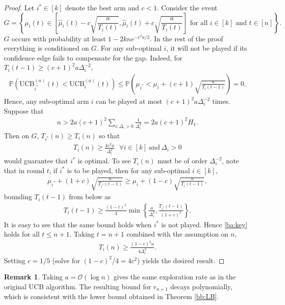 \documentclass[letterpaper,11pt,openright,openany]{book}
\numberwithin{equation}{section}
\theoremstyle{plain}
\theoremstyle{definition}
\newtheorem{Rem}[Th]{Remark}
\def\P{{\mathbb P}}
\begin{document}
\begin{proof}
Let $i^*\in [k]$ denote the best arm and $c<1$. 
Consider the event $$G =\left\{\text{$\mu_i(t)\in \left[\hat{\mu}_i(t)-c\sqrt{\frac{a}{T_i(t)}}, \hat{\mu}_i(t)+c\sqrt{\frac{a}{T_i(t)}}\right]$ for all $i\in [k]$ and $t\in [n]$}\right\}.$$ 
$G$ occurs with probability at least $1-2kne^{-c^2a/2}$. 
In the rest of the proof everything is conditioned on $G$. For any sub-optimal $i$, it will not be played if its confidence edge fails to compensate for the gap. Indeed, for $T_i(t-1)\geq (c+1)^2a\Delta_i^{-2}$, 
\begin{align*}
\P\left(\text{UCB}^{(a)}_{i^*}(t)<\text{UCB}^{(a)}_i(t)\right)\leq\P\left(\mu_{i^*}<\mu_i+(c+1)\sqrt{\frac{a}{T_i(t-1)}}\right)=0.
\end{align*}
Hence, any sub-optimal arm $i$ can be played at most $(c+1)^2a\Delta_i^{-2}$ times. Suppose that
\begin{align}
n>2a(c+1)^2\sum_{i: \Delta_i>0}\frac{1}{\Delta_i^2}=2a(c+1)^2H_1. \label{uppd}
\end{align}
Then on $G$, $T_{i^*}(n)\geq T_{i}(n)$ so that 
\begin{align*}
T_i(n)\geq\frac{4c^2a}{\Delta_i^2}\ \ \ \forall i\in [k] \ \text{and}  \ \Delta_i>0
\end{align*}
would guarantee that $i^*$ is optimal. To see $T_i(n)$ must be of order $\Delta_i^{-2}$, note that in round $t$, if $i^*$ is to be played, then for any sub-optimal $i\in [k]$, 
\begin{align*}
\mu_{i^*}+(1+c)\sqrt{\frac{a}{T_{i^*}(t-1)}}\geq \mu_i +(1-c)\sqrt{\frac{a}{T_{i}(t-1)}},
\end{align*} 
bounding $T_i(t-1)$ from below as
\begin{align}
T_i(t-1)\geq \frac{(1-c)^2}{4}\min\left\{\frac{a}{\Delta_i^2}, \frac{T_{i^*}(t-1)}{(1+c)^2}\right\}. \label{ba:key}
\end{align}
It is easy to see that the same bound holds when $i^*$ is not played. Hence \eqref{ba:key} holds for all $t\leq n+1$. Taking $t=n+1$ combined with the assumption on $n$, 
\begin{align*}
T_i(n)\geq \frac{(1-c)^2a}{4\Delta_i^2}. 
\end{align*}
Setting $c=1/5$ (solve for $(1-c)^2/4=4c^2$) yields the desired result.   
\end{proof} 
\begin{Rem}
Taking $a=\mathcal O(\log n)$ gives the same exploration rate as in the original UCB algorithm. The resulting bound for $r_{n+1}$ decays polynomially, which is consistent with the lower bound obtained in Theorem \ref{bb:LB}.  
\end{Rem}
\end{document}
